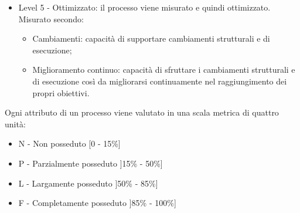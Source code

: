 \documentclass[../NormeDiProgetto_v3.0.0.tex]{subfiles}
\begin{document}
\begin{itemize}
\begin{itemize}
						\end{itemize}
					\item Level 5 - Ottimizzato: il processo viene misurato e quindi ottimizzato.
					Misurato secondo:
						\begin{itemize}
							\item Cambiamenti: capacità di supportare cambiamenti strutturali e di esecuzione;
							\item Miglioramento continuo: capacità di sfruttare i cambiamenti strutturali e di esecuzione così da migliorarsi continuamente nel raggiungimento dei propri obiettivi.
						\end{itemize}
					\end{itemize}
					Ogni attributo di un processo viene valutato in una scala metrica di quattro unità:
					\begin{itemize}
						\item N - Non posseduto [0 - 15\%]
						\item P - Parzialmente posseduto ]15\% - 50\%]
						\item L - Largamente posseduto ]50\% - 85\%]
						\item F - Completamente posseduto ]85\% - 100\%]
					\end{itemize}
					
\end{document}
